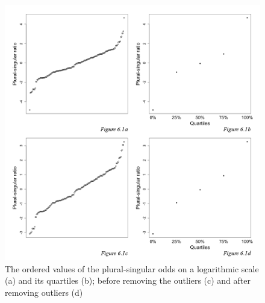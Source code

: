 \begin{figure}
\includegraphics[width=\textwidth]{figures/6-Figure_1.png}
\caption{The ordered values of the plural-singular odds on a logarithmic scale (a) and its quartiles (b); before removing the outliers (c) and after removing outliers (d)\label{fig:6:1}}
\end{figure}

